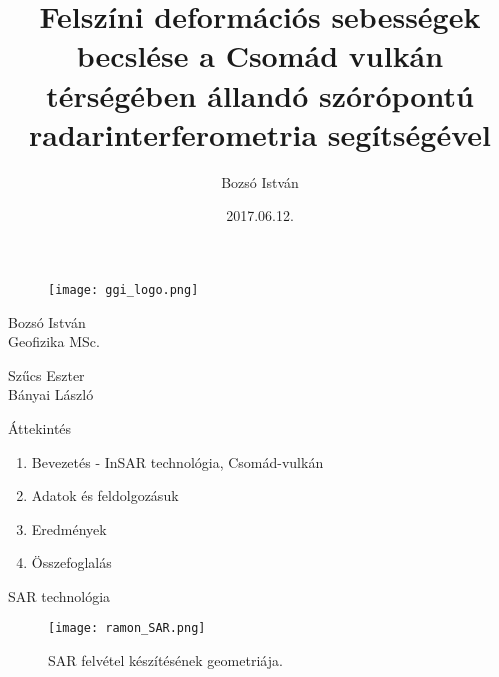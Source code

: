 \documentclass[14pt, aspectratio=169]{beamer}
\title[Radar interferometria]{Felszíni deformációs sebességek becslése a Csomád vulkán térségében állandó szórópontú radarinterferometria segítségével}
\author{Bozsó István}
\date{2017.06.12.}
\begin{document}

\begin{frame}
    \begin{figure}
        \centering
        \texttt{[image: ggi\_logo.png]}
    \end{figure}


    \vspace{15pt}

    \begin{minipage}[t]{0.3\textwidth}
        {\footnotesize Bozsó István\\Geofizika MSc.}
    \end{minipage}
    \begin{minipage}[t]{0.3\textwidth}
        {\footnotesize Szűcs Eszter\\Bányai László}
    \end{minipage}
\end{frame}


\begin{frame}{Áttekintés}

    \begin{enumerate}
        \item Bevezetés - InSAR technológia, Csomád-vulkán
        \item Adatok és feldolgozásuk
        \item Eredmények
        \item Összefoglalás
    \end{enumerate}

\end{frame}


\begin{frame}{SAR technológia}
    \begin{figure}
        \centering
        \texttt{[image: ramon\_SAR.png]}
        \caption{SAR felvétel készítésének geometriája.}
    \end{figure}
    \vspace{-35pt}
\end{frame}
\end{document}
